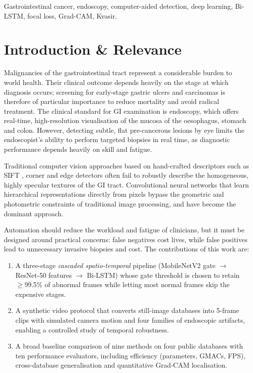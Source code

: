 \documentclass[conference]{IEEEtran}
\begin{document}
\begin{IEEEkeywords}
Gastrointestinal cancer, endoscopy, computer-aided detection, deep learning, Bi-LSTM, focal loss, Grad-CAM, Kvasir.
\end{IEEEkeywords}

\section{Introduction \& Relevance}
\label{sec:introduction}

Malignancies of the gastrointestinal tract represent a considerable burden to world health. Their clinical outcome
depends heavily on the stage at which diagnosis occurs; screening for early-stage gastric ulcers and carcinomas is
therefore of particular importance to reduce mortality and avoid radical treatment. The clinical standard for GI
examination is endoscopy, which offers real-time, high-resolution visualisation of the mucosa of the oesophagus,
stomach and colon. However, detecting subtle, flat pre-cancerous lesions by eye limits the endoscopist's ability to
perform targeted biopsies in real time, as diagnostic performance depends heavily on skill and fatigue.

Traditional computer vision approaches based on hand-crafted descriptors such as SIFT \cite{lowe2004sift}, corner and
edge detectors often fail to robustly describe the homogeneous, highly specular textures of the GI tract.
Convolutional neural networks that learn hierarchical representations directly from pixels bypass the geometric and
photometric constraints of traditional image processing, and have become the dominant approach.

Automation should reduce the workload and fatigue of clinicians, but it must be designed around practical concerns:
false negatives cost lives, while false positives lead to unnecessary invasive biopsies and cost. The contributions of
this work are:
\begin{enumerate}
\item A three-stage \emph{cascaded spatio-temporal} pipeline (MobileNetV2 gate $\rightarrow$ ResNet-50 features
$\rightarrow$ Bi-LSTM) whose gate threshold is chosen to retain $\geq$99.5\% of abnormal frames while letting most
normal frames skip the expensive stages.
\item A synthetic video protocol that converts still-image databases into 5-frame clips with simulated camera motion
and four families of endoscopic artifacts, enabling a controlled study of temporal robustness.
\item A broad baseline comparison of nine methods on four public databases with ten performance evaluators, including
efficiency (parameters, GMACs, FPS), cross-database generalisation and quantitative Grad-CAM localisation.
\end{enumerate}
\end{document}
